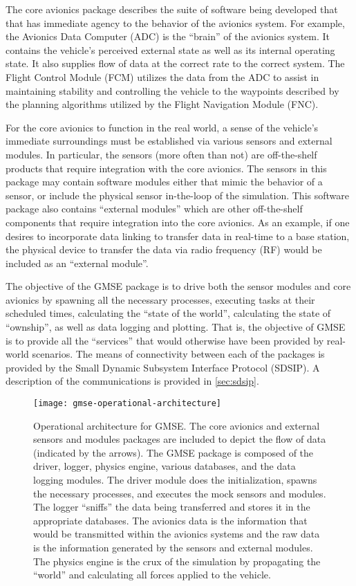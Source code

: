 The core avionics package describes the suite of software being developed that that has immediate agency to the behavior
of the avionics system. For example, the Avionics Data Computer (ADC) is the ``brain'' of the avionics system. It
contains the vehicle's perceived external state as well as its internal operating state. It also supplies flow of data
at the correct rate to the correct system. The Flight Control Module (FCM) utilizes the data from the ADC to assist in
maintaining stability and controlling the vehicle to the waypoints described by the planning algorithms utilized by the
Flight Navigation Module (FNC).

For the core avionics to function in the real world, a sense of the vehicle's immediate surroundings must be established
via various sensors and external modules. In particular, the sensors (more often than not) are off-the-shelf products
that require integration with the core avionics. The sensors in this package may contain software modules either that
mimic the behavior of a sensor, or include the physical sensor in-the-loop of the simulation. This software package also
contains ``external modules'' which are other off-the-shelf components that require integration into the core avionics. As
an example, if one desires to incorporate data linking to transfer data in real-time to a base station, the physical
device to transfer the data via radio frequency (RF) would be included as an ``external module''.

The objective of the GMSE package is to drive both the sensor modules and core avionics by spawning all the necessary
processes, executing tasks at their scheduled times, calculating the ``state of the world'', calculating the state of
``ownship'', as well as data logging and plotting. That is, the objective of GMSE is to provide all the ``services''
that would otherwise have been provided by real-world scenarios. The means of connectivity between each of the packages
is provided by the Small Dynamic Subsystem Interface Protocol (SDSIP). A description of the communications is provided
in \autoref{sec:sdsip}.

\begin{figure*}[ht]
  \texttt{[image: gmse-operational-architecture]}
  \caption{Operational architecture for GMSE. The core avionics and external sensors and modules packages are included
    to depict the flow of data (indicated by the arrows). The GMSE package is composed of the driver, logger, physics
    engine, various databases, and the data logging modules. The driver module does the initialization, spawns the
    necessary processes, and executes the mock sensors and modules. The logger ``sniffs'' the data being transferred and
    stores it in the appropriate databases. The avionics data is the information that would be transmitted within the
    avionics systems and the raw data is the information generated by the sensors and external modules. The physics
    engine is the crux of the simulation by propagating the ``world'' and calculating all forces applied to the
    vehicle.}
  \label{fig:gmse-operational-architecture}
\end{figure*}

